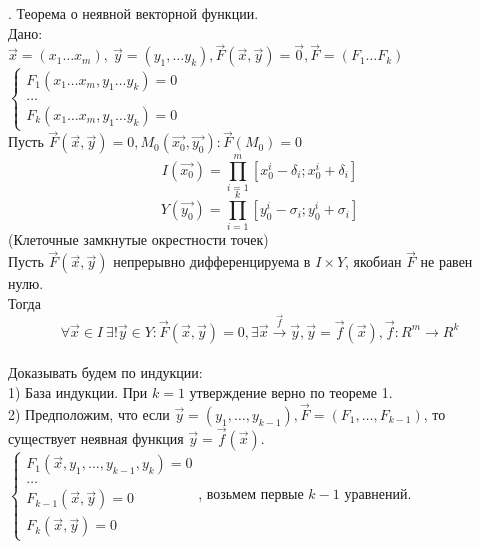 \documentclass[12pt]{article}
\begin{document}
. Теорема о неявной векторной функции.\\
Дано:\\
$\overrightarrow{x}=(x_1\dots x_m), \ \overrightarrow{y}=(y_1,\dots y_k), \overrightarrow{F}(\overrightarrow{x},\overrightarrow{y})=\overrightarrow{0}, \overrightarrow{F} = (F_1 \dots F_k)$\\
$\begin{cases}F_1(x_1\dots x_m, y_1 \dots y_k)=0 \\ \dots \\ F_k(x_1\dots x_m, y_1 \dots y_k)=0 \end{cases}$\\
Пусть $\overrightarrow{F}(\overrightarrow{x},\overrightarrow{y})=0, M_0(\overrightarrow{x_0},\overrightarrow{y_0}) : \overrightarrow{F}(M_0) = 0$\\
$$I(\overrightarrow{x_0}) = \prod_{i=1}^m [x_0^i-\delta_i; x_0^i+\delta_i]$$
$$Y(\overrightarrow{y_0}) = \prod_{i=1}^k [y_0^i-\sigma_i; y_0^i+\sigma_i]$$
(Клеточные замкнутые окрестности точек)\\
Пусть $\overrightarrow{F}(\overrightarrow{x},\overrightarrow{y})$ непрерывно дифференцируема в $I \times Y$, якобиан $\overrightarrow{F}$ не равен нулю.\\
Тогда\\
$$\forall \overrightarrow{x} \in I \ \exists! \overrightarrow{y} \in Y : \overrightarrow{F}(\overrightarrow{x},\overrightarrow{y})=0, \exists\overrightarrow{x} \overset{\overrightarrow{f}}{\to}\overrightarrow{y}, \overrightarrow{y}=\overrightarrow{f}(\overrightarrow{x}), \overrightarrow{f}:R^m\to R^k$$
\\
Доказывать будем по индукции:\\
1) База индукции. При $k=1$ утверждение верно по теореме 1.\\
2) Предположим, что если $\overrightarrow{y} = (y_1,\dots,y_{k-1}), \overrightarrow{F}=(F_1,\dots,F_{k-1})$, то существует неявная функция $\overrightarrow{y} = \overrightarrow{f}(\overrightarrow{x})$.\\
$\begin{cases}F_1(\overrightarrow{x},y_1,\dots,y_{k-1},y_k) = 0 \\ \dots \\ F_{k-1}(\overrightarrow{x},\overrightarrow{y}) = 0 \\ F_k(\overrightarrow{x},\overrightarrow{y}) = 0 \end{cases}$, возьмем первые $k-1$ уравнений.\\
\end{document}
